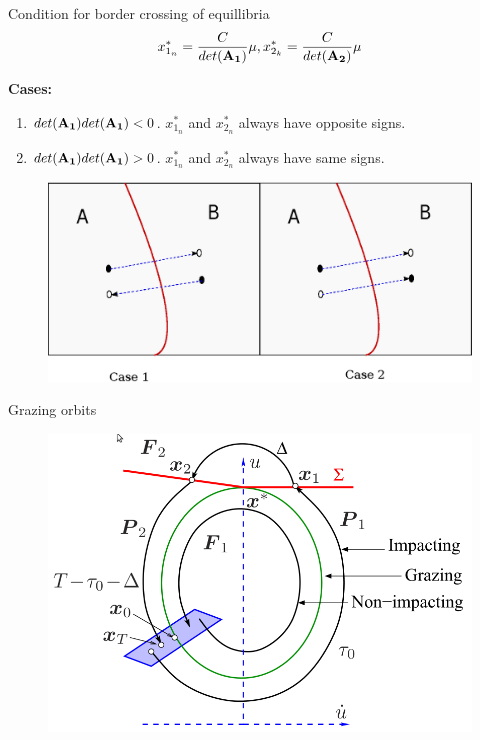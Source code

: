 \documentclass[xcolor=x11names,compress]{beamer}
\renewcommand{\(}{\begin{columns}}
\renewcommand{\)}{\end{columns}}
\newcommand{\<}[1]{\begin{column}{#1}}
\renewcommand{\>}{\end{column}}
\begin{document}
\begin{frame}{Condition for border crossing of equillibria}
\[
x^*_{1_n}=\frac{C}{det(\bf{A_1})}\mu, x^*_{2_k}=\frac{C}{det(\bf{A_2})}\mu
\]

{\bf Cases:}\\
\begin{enumerate}
\item $det({\bf A_1})det({\bf A_1})<0$.  $x^*_{1_n}$ and $x^*_{2_n}$ always have 
opposite signs.  \\
\item $det({\bf A_1})det({\bf A_1})>0$.  $x^*_{1_n}$ and $x^*_{2_n}$ always have 
same signs.  
\end{enumerate}

\begin{figure}
\begin{center}
\includegraphics[width=0.9\columnwidth]{../2011-09-11/cases}
\end{center}
\end{figure}

\end{frame}


\begin{frame}{Grazing orbits}
\begin{figure}
\caption{}
\begin{center}
\includegraphics[width=0.9\columnwidth]{../2011-09-19/graz}
\end{center}
\end{figure}


\end{frame}
\end{document}
